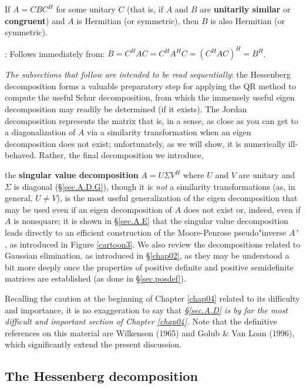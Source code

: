 \begin{fact} \label{fact.A.D.B}
If $A=CBC^{H}$ for some unitary $C$ (that is,
if $A$ and $B$ are {\bf unitarily similar} or {\bf congruent}) and $A$ is Hermitian (or
symmetric), then $B$ is also Hermitian (or symmetric).
\end{fact}

\/: Follows immediately from:
$B=C^{H}A C=C^{H}A^{H} C=(C^{H}A C)^{H}=B^{H}$. \endproof \medskip

{\it The subsections that follow are intended to be read sequentially}: the Hessenberg
decomposition forms a valuable preparatory step for applying the QR
method to compute the useful Schur decomposition, from which the immensely useful
eigen decomposition may readily be determined (if it exists).  The Jordan decomposition
represents the matrix that is, in a sense, as close as you can get to a diagonalization of $A$
via a similarity transformation when an eigen decomposition does not exist; unfortunately, as we will
show, it is numerically ill-behaved.  Rather, the final decomposition we introduce, 
\beginmylistb
\item the {\bf singular value decomposition} $A=U \Sigma V^H$ where $U$ and $V$ are unitary and $\Sigma$ is diagonal (\S \ref{sec.A.D.G}),
\endmylist
though it is {\it not} a similarity transformations (as, in general, $U\ne V$), is the most useful
generalization of the eigen decomposition that may be used even
if an eigen decomposition of $A$ does not exist or, indeed, even if $A$ is nonsquare;
it is shown in \S \ref{sec.A.E} that the singular value decomposition leads directly
to an efficient construction of the Moore-Penrose pseudo"inverse $A^+$, as introduced in Figure \ref{cartoon3}.
We also review the decompositions related to Gaussian elimination, as introduced in \S \ref{chap02}, as they may
be understood a bit more deeply once the properties of positive definite and positive semidefinite
matrices are established (as done in \S \ref{sec.posdef}).  

Recalling the caution at the beginning of Chapter \ref{chap04} related to its difficulty and importance, it is no exaggeration to say that
{\it \S \ref{sec.A.D} is by far the most difficult and important section of Chapter \ref{chap04}.}  Note that the definitive references on this material
are Wilkenson (1965) and Golub \& Van Loan (1996), which significantly extend the present discussion.

\clearpage

\subsection{The Hessenberg decomposition}\label{sec.A.D.A}

